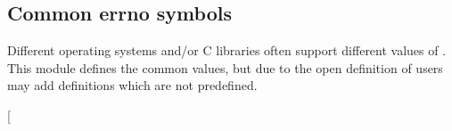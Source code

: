 \subsection{Common errno symbols}
Different operating systems and/or C libraries often support different
 values of . This module defines the common values, but due to the
 open definition of  users may add definitions which are not
 predefined.\par
\begin{haddockdesc}
\item[\begin{tabular}{@{}l}
eOK :: Errno
\end{tabular}]
\item[\begin{tabular}{@{}l}
e2BIG :: Errno
\end{tabular}]
\item[\begin{tabular}{@{}l}
eACCES :: Errno
\end{tabular}]
\item[\begin{tabular}{@{}l}
eADDRINUSE :: Errno
\end{tabular}]
\item[\begin{tabular}{@{}l}
eADDRNOTAVAIL :: Errno
\end{tabular}]
\item[\begin{tabular}{@{}l}
eADV :: Errno
\end{tabular}]
\item[\begin{tabular}{@{}l}
eAFNOSUPPORT :: Errno
\end{tabular}]
\item[\begin{tabular}{@{}l}
eAGAIN :: Errno
\end{tabular}]
\item[\begin{tabular}{@{}l}
eALREADY :: Errno
\end{tabular}]
\item[\begin{tabular}{@{}l}
eBADF :: Errno
\end{tabular}]
\item[\begin{tabular}{@{}l}
eBADMSG :: Errno
\end{tabular}]
\item[\begin{tabular}{@{}l}

\end{tabular}
\end{haddockdesc}
